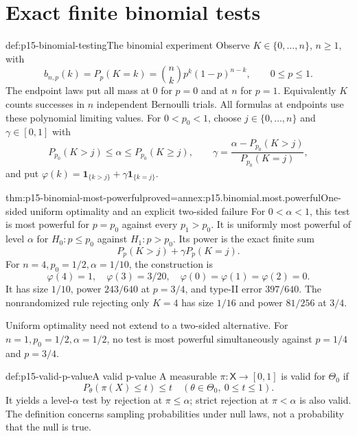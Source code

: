 \section{Exact finite binomial tests}

\begin{hbdefinition}{def:p15-binomial-testing}{The binomial experiment}
Observe \(K\in\{0,\ldots,n\}\), \(n\geq1\), with
\[
                 b_{n,p}(k)=P_p(K=k)=\binom nkp^k(1-p)^{n-k},
                                  \qquad0\leq p\leq1.
\]
The endpoint laws put all mass at 0 for \(p=0\) and at
\(n\) for \(p=1\). Equivalently \(K\) counts successes
in \(n\) independent Bernoulli trials.
All formulas at endpoints use these polynomial limiting values.
For \(0<p_0<1\), choose \(j\in\{0,\ldots,n\}\) and
\(\gamma\in[0,1]\) with
\[
 P_{p_0}(K>j)\leq\alpha\leq P_{p_0}(K\geq j),\qquad
 \gamma=\frac{\alpha-P_{p_0}(K>j)}{P_{p_0}(K=j)},
\]
and put \(\varphi(k)=\mathbf1_{\{k>j\}}+\gamma\mathbf1_{\{k=j\}}\).
\end{hbdefinition}

\begin{hbtheorem}{thm:p15-binomial-most-powerful}{proved=annex:p15.binomial.most.powerful}{One-sided uniform optimality and an explicit two-sided failure}
For \(0<\alpha<1\), this test is most powerful for
\(p=p_0\) against every \(p_1>p_0\).
It is uniformly most powerful of level \(\alpha\)
for \(H_0:p\leq p_0\) against \(H_1:p>p_0\).
Its power is the exact finite sum
\[
                   P_p(K>j)+\gamma P_p(K=j).
\]
For \(n=4,p_0=1/2,\alpha=1/10\), the construction is
\[
 \varphi(4)=1,\quad\varphi(3)=3/20,\quad
 \varphi(0)=\varphi(1)=\varphi(2)=0.
\]
It has size \(1/10\), power \(243/640\) at \(p=3/4\),
and type-II error \(397/640\).
The nonrandomized rule rejecting only \(K=4\) has
size \(1/16\) and power \(81/256\) at \(3/4\).

Uniform optimality need not extend to a two-sided
alternative. For \(n=1,p_0=1/2,\alpha=1/2\), no test
is most powerful simultaneously against \(p=1/4\)
and \(p=3/4\).
\end{hbtheorem}

\begin{hbdefinition}{def:p15-valid-p-value}{A valid p-value}
A measurable \(\pi:\mathsf X\to[0,1]\) is valid for
\(\Theta_0\) if
\[
                  P_\theta(\pi(X)\leq t)\leq t
           \quad(\theta\in\Theta_0,\ 0\leq t\leq1).
\]
It yields a level-\(\alpha\) test by rejection at
\(\pi\leq\alpha\); strict rejection at \(\pi<\alpha\)
is also valid. The definition concerns sampling probabilities
under null laws, not a probability that the null is true.
\end{hbdefinition}

